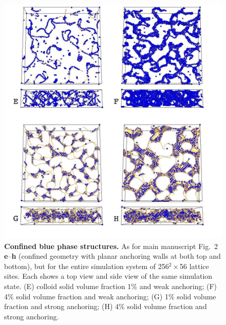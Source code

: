 \documentclass[12pt,twoside]{article}
\begin{document}
\begin{figure}[!h]
\begin{center}
\includegraphics[scale=0.42]{support-fig6.pdf}
\end{center}
\caption{\textbf{Confined blue phase structures.}
As for main manuscript Fig.~2 \textbf{e}--\textbf{h}
(confined geometry with planar
anchoring walls at both top and bottom), but for the entire simulation
system of 256$^2\times$56 lattice sites. Each shows a top view and
side view of the same simulation state. (E) colloid solid volume fraction 1\%
and weak anchoring; (F) 4\% solid volume fraction and weak anchoring;
(G) 1\% solid volume fraction and strong anchoring; (H) 4\% solid
volume fraction and strong anchoring.}
\end{figure}

\newpage
\end{document}
